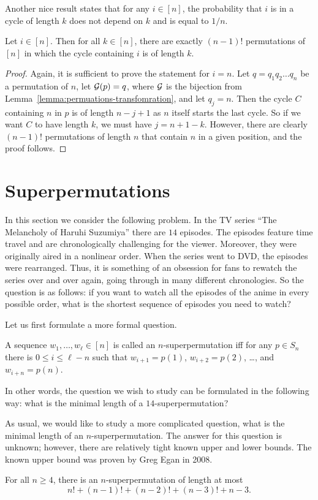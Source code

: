 Another nice result states that for any $i \in [n]$, the probability that
$i$ is in a cycle of length $k$ does not depend on $k$ and is equal to $1 / n$.
\begin{theorem}
  Let $i \in [n]$. Then for all $k \in [n]$, there are exactly $(n - 1)!$
  permutations of $[n]$ in which the cycle containing $i$ is of length $k$.
\end{theorem}
\begin{proof}
  Again, it is sufficient to prove the statement for $i = n$. Let
  $q = q_1 q_2 \dots q_n$ be a permutation of $n$, let $\mathcal{G}(p) = q$, where
  $\mathcal{G}$ is the bijection from Lemma~\ref{lemma:permuations-transfomration},
  and let  $q_j = n$. Then the cycle $C$ containing $n$ in $p$ is of length
  $n - j + 1$ as $n$ itself starts the last cycle. So if we want $C$ to have
  length $k$, we must have $j = n + 1 - k$. However, there are clearly
  $(n - 1)!$ permutations of length $n$ that contain $n$ in a given position,
  and the proof follows.
\end{proof}

\section{Superpermutations}
In this section we consider the following problem. In the TV series ``The
Melancholy of Haruhi Suzumiya'' there are $14$ episodes. The episodes feature time travel and are chronologically challenging for the viewer. Moreover,
they were originally aired in a nonlinear order. When the series went to DVD,
the episodes were rearranged. Thus, it is something of an obsession for fans to
rewatch the series over and over again, going through in many different
chronologies. So the question is as follows: if you want to watch all the
episodes of the anime in every possible order, what is the shortest sequence of
episodes you need to watch?

Let us first formulate a more formal question.
\begin{definition}
  A sequence $w_1, \dots, w_\ell \in [n]$ is called an $n$-superpermutation iff
  for any $p \in S_n$ there is $0 \le i \le \ell - n$ such that
  $w_{i + 1} = p(1)$, $w_{i + 2} = p(2)$, \dots, and $w_{i + n} = p(n)$.
\end{definition}
In other words, the question we wish to study can be formulated in the
following way: what is the minimal length of a $14$-superpermutation?

As usual, we would like to study a more complicated question, what is the
minimal length of an $n$-superpermutation. The answer for this question is
unknown; however, there are relatively tight known upper and lower bounds. The
known upper bound was proven by Greg Egan in 2008.
\begin{theorem}
  For all $n \ge 4$, there is an $n$-superpermutation of length at most
  \[
    n! + (n - 1)! + (n - 2)! + (n - 3)! + n - 3.
  \]
\end{theorem}

